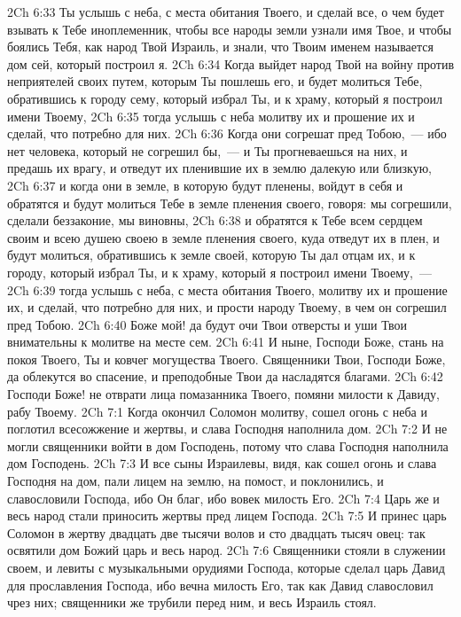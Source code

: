 \vs 2Ch 6:33 Ты услышь с неба, с места обитания Твоего, и сделай все, о чем будет взывать к Тебе иноплеменник, чтобы все народы земли узнали имя Твое, и чтобы боялись Тебя, как народ Твой Израиль, и знали, что Твоим именем называется дом сей, который построил я.
\vs 2Ch 6:34 Когда выйдет народ Твой на войну против неприятелей своих путем, которым Ты пошлешь его, и будет молиться Тебе, обратившись к городу сему, который избрал Ты, и к храму, который я построил имени Твоему,
\vs 2Ch 6:35 тогда услышь с неба молитву их и прошение их и сделай, что потребно для них.
\vs 2Ch 6:36 Когда они согрешат пред Тобою,~--- ибо нет человека, который не согрешил бы,~--- и Ты прогневаешься на них, и предашь их врагу, и отведут их пленившие их в землю далекую или близкую,
\vs 2Ch 6:37 и когда они в земле, в которую будут пленены, войдут в себя и обратятся и будут молиться Тебе в земле пленения своего, говоря: мы согрешили, сделали беззаконие, мы виновны,
\vs 2Ch 6:38 и обратятся к Тебе всем сердцем своим и всею душею своею в земле пленения своего, куда отведут их в плен, и будут молиться, обратившись к земле своей, которую Ты дал отцам их, и к городу, который избрал Ты, и к храму, который я построил имени Твоему,~---
\vs 2Ch 6:39 тогда услышь с неба, с места обитания Твоего, молитву их и прошение их, и сделай, что потребно для них, и прости народу Твоему, в чем он согрешил пред Тобою.
\vs 2Ch 6:40 Боже мой! да будут очи Твои отверсты и уши Твои внимательны к молитве на месте сем.
\vs 2Ch 6:41 И ныне, Господи Боже, стань на  покоя Твоего, Ты и ковчег могущества Твоего. Священники Твои, Господи Боже, да облекутся во спасение, и преподобные Твои да насладятся благами.
\vs 2Ch 6:42 Господи Боже! не отврати лица помазанника Твоего, помяни милости к Давиду, рабу Твоему.
\vs 2Ch 7:1 Когда окончил Соломон молитву, сошел огонь с неба и поглотил всесожжение и жертвы, и слава Господня наполнила дом.
\vs 2Ch 7:2 И не могли священники войти в дом Господень, потому что слава Господня наполнила дом Господень.
\vs 2Ch 7:3 И все сыны Израилевы, видя, как сошел огонь и слава Господня на дом, пали лицем на землю, на помост, и поклонились, и славословили Господа, ибо Он благ, ибо вовек милость Его.
\rsbpar\vs 2Ch 7:4 Царь же и весь народ стали приносить жертвы пред лицем Господа.
\vs 2Ch 7:5 И принес царь Соломон в жертву двадцать две тысячи волов и сто двадцать тысяч овец: так освятили дом Божий царь и весь народ.
\vs 2Ch 7:6 Священники стояли в служении своем, и левиты с музыкальными орудиями Господа, которые сделал царь Давид для прославления Господа, ибо вечна милость Его, так как Давид славословил чрез них; священники же трубили перед ним, и весь Израиль стоял.
